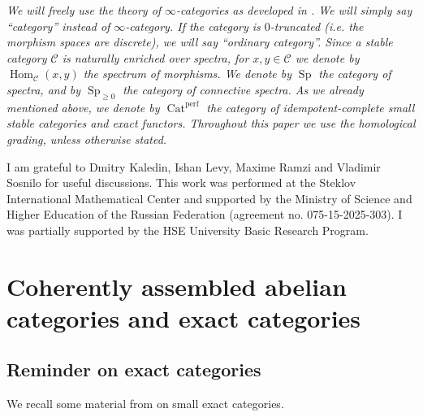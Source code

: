 \documentclass[11pt,leqno]{amsart}
\newtheorem{defi}[theo]{Definition}
\numberwithin{equation}{section}
\def\Hom{\operatorname{Hom}}
\newcommand{\Cat}{\operatorname{Cat}}
\newcommand{\cC}{{\mathcal C}}
\newcommand{\cE}{{\mathcal E}}
\newcommand{\perf}{\operatorname{perf}}
\newcommand{\Sp}{\operatorname{Sp}}
\newcommand{\Ind}{\operatorname{Ind}}
\begin{document}
{} {\it We will freely use the theory of $\infty$-categories as developed in \cite{Lur09, Lur17a}. We will simply say ``category'' instead of $\infty$-category. If the category is $0$-truncated (i.e. the morphism spaces are discrete), we will say ``ordinary category''. Since a stable category $\cC$ is naturally enriched over spectra, for $x,y\in\cC$ we denote by $\Hom_{\cC}(x,y)$ the spectrum of morphisms. We denote by $\Sp$ the category of spectra, and by $\Sp_{\geq 0}$ the category of connective spectra. As we already mentioned above, we denote by $\Cat^{\perf}$ the category of idempotent-complete small stable categories and exact functors. Throughout this paper we use the homological grading, unless otherwise stated.}

{} I am grateful to Dmitry Kaledin, Ishan Levy, Maxime Ramzi and Vladimir Sosnilo for useful discussions. This
work was performed at the Steklov International Mathematical Center and supported by
the Ministry of Science and Higher Education of the Russian Federation (agreement no.
075-15-2025-303). I was partially supported by the HSE University Basic Research
Program.

\section{Coherently assembled abelian categories and exact categories}
\label{sec:coh_ass_exact}


\subsection{Reminder on exact categories}
\label{ssec:reminder_on_exact}

We recall some material from \cite{Bar15, Kle, SW26} on small exact categories. 
\end{document}

